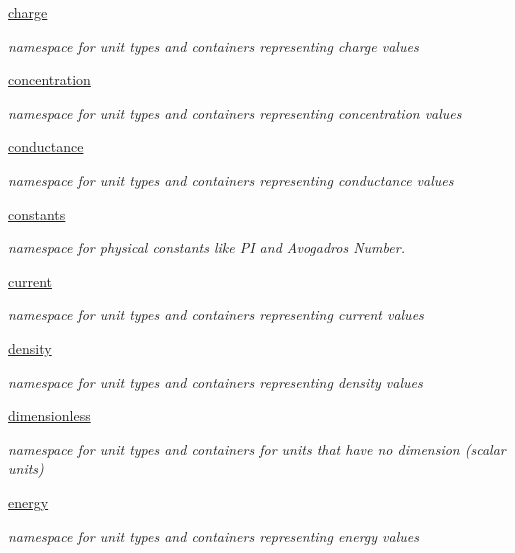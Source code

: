 \begin{DoxyCompactItemize}
 \hyperlink{namespaceunits_1_1charge}{charge}
\begin{DoxyCompactList}\small\item\em namespace for unit types and containers representing charge values \end{DoxyCompactList}\item 
 \hyperlink{namespaceunits_1_1concentration}{concentration}
\begin{DoxyCompactList}\small\item\em namespace for unit types and containers representing concentration values \end{DoxyCompactList}\item 
 \hyperlink{namespaceunits_1_1conductance}{conductance}
\begin{DoxyCompactList}\small\item\em namespace for unit types and containers representing conductance values \end{DoxyCompactList}\item 
 \hyperlink{namespaceunits_1_1constants}{constants}
\begin{DoxyCompactList}\small\item\em namespace for physical constants like P\+I and Avogadro\textquotesingle{}s Number. \end{DoxyCompactList}\item 
 \hyperlink{namespaceunits_1_1current}{current}
\begin{DoxyCompactList}\small\item\em namespace for unit types and containers representing current values \end{DoxyCompactList}\item 
 \hyperlink{namespaceunits_1_1density}{density}
\begin{DoxyCompactList}\small\item\em namespace for unit types and containers representing density values \end{DoxyCompactList}\item 
 \hyperlink{namespaceunits_1_1dimensionless}{dimensionless}
\begin{DoxyCompactList}\small\item\em namespace for unit types and containers for units that have no dimension (scalar units) \end{DoxyCompactList}\item 
 \hyperlink{namespaceunits_1_1energy}{energy}
\begin{DoxyCompactList}\small\item\em namespace for unit types and containers representing energy values \end{DoxyCompactList}\item 

\end{DoxyCompactItemize}
